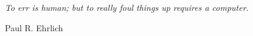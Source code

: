 \cleardoublepage       %
\thispagestyle{empty}  %
\epigraph{%
  \textit{To err is human; but to really foul things up requires a computer.}%
}{Paul R. Ehrlich}
\cleardoublepage
